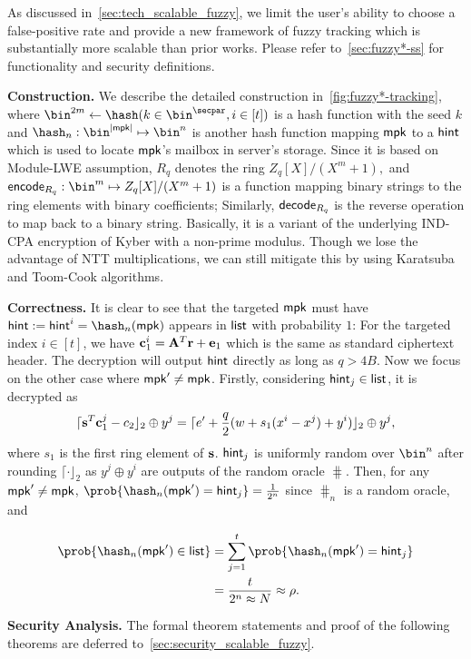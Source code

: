 As discussed in~\cref{sec:tech_scalable_fuzzy}, we limit the user's ability to choose a false-positive rate and provide a new framework of fuzzy tracking which is substantially more scalable than prior works\cite{CCS:BLMG21,USENIX:MSSSV22,C:LiuTro22}. 
Please refer to~\cref{sec:fuzzy*-ss} for functionality and security definitions.

\smallskip\noindent\textbf{Construction.}
We describe the detailed construction in~\cref{fig:fuzzy*-tracking}, where $\bin^{2m}\gets\hash(k\in\bin^\secpar,i\in[t])$ is a hash function with the seed $k$ and $\hash_n:\bin^{|\mpk|}\mapsto\bin^n$ is another hash function mapping $\mathsf{mpk}$ to a $\mathsf{hint}$ which is used to locate $\mathsf{mpk}$'s mailbox in server's storage. Since it is based on Module-LWE assumption, $R_q$ denotes the ring $Z_q[X]/(X^m +1),$
and $\msf{encode}_{R_q}:\bin^m \mapsto Z_q[X]/(X^m +1)$ is a function mapping binary strings to the ring elements with binary coefficients; Similarly, $\mathsf{decode}_{R_q}$ is the reverse operation to map back to a binary string.
Basically, it is a variant of the underlying IND-CPA encryption of Kyber with a non-prime modulus.
Though we lose the advantage of NTT multiplications, we can still mitigate this by using Karatsuba and Toom-Cook algorithms. 


\smallskip\noindent\textbf{Correctness.}
It is clear to see that the targeted $\mathsf{mpk}$ must have $\hint:=\hint^i=\hash_n(\mpk)$ appears in $\mathsf{list}$ with probability $1$: For the targeted index $i\in[t]$, we have $\mathbf{c}_1^{i}=\mathbf{A}^T\mathbf{r}+\mathbf{e}_1$ which is the same as standard ciphertext header. The decryption will output $\mathsf{hint}$ directly as long as $q>4B$.
Now we focus on the other case where $\mathsf{mpk}'\ne\mathsf{mpk}$.
Firstly, considering $\mathsf{hint}_j\in\mathsf{list}$, it is decrypted as $$\lceil\mathbf{s}^T\mathbf{c}_1^j-c_2\rfloor_2\oplus y^j=\lceil e'+\frac{q}{2}(w+s_1(x^i-x^j)+y^i) \rfloor_2\oplus y^j,$$
where $s_1$ is the first ring element of $\mathbf{s}$. $\mathsf{hint}_j$ is uniformly random over $\bin^n$ after rounding $\lceil\cdot\rfloor_2$ as $y^j\oplus y^i$ are outputs of the random oracle $\hash$. 
Then, for any $\mathsf{mpk}'\ne \mathsf{mpk}$, $\prob{\hash_n(\mpk')=\hint_j}=\frac{1}{2^n}$ since $\hash_n$ is a random oracle, and

\begin{align*}
    \prob{\hash_n(\mpk')\in\lis}&=\sum_{j=1}^t\prob{\hash_n(\mpk')=\hint_j}\\
    &=\frac{t}{2^n\approx N}\approx\rho.
\end{align*}

\smallskip\noindent\textbf{Security Analysis.}
The formal theorem statements and proof of the following theorems are deferred to~\cref{sec:security_scalable_fuzzy}.

